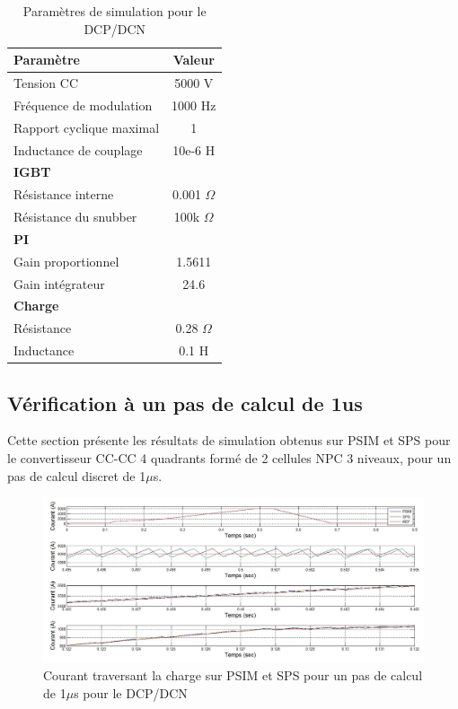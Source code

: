 \begin{table}[htb]
\centering
\begin{tabular}{|l|c|} 
  \hline
  \textbf{Paramètre} & \textbf{Valeur}  \\
  \hline\hline
  Tension CC & 5000 V\\ \hline
  Fréquence de modulation & 1000 Hz\\ \hline
  Rapport cyclique maximal & 1 \\ \hline
  Inductance de couplage & 10e-6 H \\ \hline \hline
  \multicolumn{2}{|l|}{\textbf{IGBT}}\\ \hline
  Résistance interne & 0.001 $\Omega$\\
  Résistance du snubber  & 100k $\Omega$\\ \hline \hline
   \multicolumn{2}{|l|}{\textbf{PI}}\\ \hline
  Gain proportionnel & 1.5611 \\
  Gain intégrateur & 24.6 \\ \hline \hline
  \multicolumn{2}{|l|}{\textbf{Charge}}\\ \hline
  Résistance & 0.28 $\Omega$\\
  Inductance & 0.1 H \\
  \hline
\end{tabular}
\caption{Paramètres de simulation pour le DCP/DCN}
\label{p_DCP}
\end{table}
\clearpage


\subsection{Vérification à un pas de calcul de 1us}
Cette section présente les résultats de simulation obtenus sur PSIM et SPS pour le convertisseur CC-CC 4 quadrants formé de 2 cellules NPC 3 niveaux, pour un pas de calcul discret de 1$\mu$s.



\begin{figure}[htb]
\centering
\includegraphics[scale=0.5]{fig/DCPDCN/DCPCourantCharge1u.jpg}
\caption{Courant traversant la charge sur PSIM et SPS pour un pas de calcul de 1$\mu$s pour le DCP/DCN}
\label{DC_ch_cou_1}
\end{figure}



